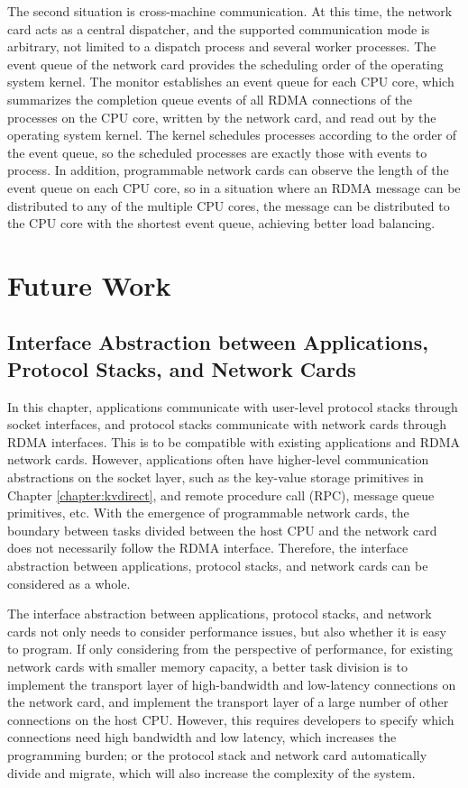 The second situation is cross-machine communication. At this time, the network card acts as a central dispatcher, and the supported communication mode is arbitrary, not limited to a dispatch process and several worker processes. The event queue of the network card provides the scheduling order of the operating system kernel. The monitor establishes an event queue for each CPU core, which summarizes the completion queue events of all RDMA connections of the processes on the CPU core, written by the network card, and read out by the operating system kernel. The kernel schedules processes according to the order of the event queue, so the scheduled processes are exactly those with events to process. In addition, programmable network cards can observe the length of the event queue on each CPU core, so in a situation where an RDMA message can be distributed to any of the multiple CPU cores, the message can be distributed to the CPU core with the shortest event queue, achieving better load balancing.

\section{Future Work}

\subsection{Interface Abstraction between Applications, Protocol Stacks, and Network Cards}
\label{future:nic-interface}

In this chapter, applications communicate with user-level protocol stacks through socket interfaces, and protocol stacks communicate with network cards through RDMA interfaces. This is to be compatible with existing applications and RDMA network cards. However, applications often have higher-level communication abstractions on the socket layer, such as the key-value storage primitives in Chapter \ref{chapter:kvdirect}, and remote procedure call (RPC), message queue primitives, etc. With the emergence of programmable network cards, the boundary between tasks divided between the host CPU and the network card does not necessarily follow the RDMA interface. Therefore, the interface abstraction between applications, protocol stacks, and network cards can be considered as a whole.

The interface abstraction between applications, protocol stacks, and network cards not only needs to consider performance issues, but also whether it is easy to program. If only considering from the perspective of performance, for existing network cards with smaller memory capacity, a better task division is to implement the transport layer of high-bandwidth and low-latency connections on the network card, and implement the transport layer of a large number of other connections on the host CPU. However, this requires developers to specify which connections need high bandwidth and low latency, which increases the programming burden; or the protocol stack and network card automatically divide and migrate, which will also increase the complexity of the system.

